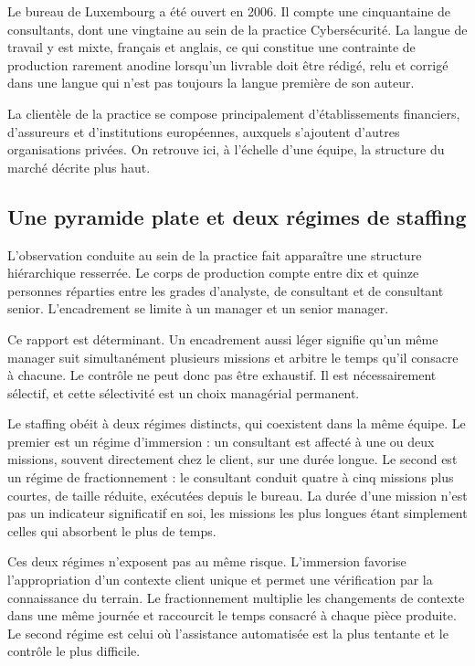 Le bureau de Luxembourg a été ouvert en 2006. Il compte une cinquantaine de consultants,
dont une vingtaine au sein de la practice Cybersécurité. La langue de travail y est mixte,
français et anglais, ce qui constitue une contrainte de production rarement anodine
lorsqu'un livrable doit être rédigé, relu et corrigé dans une langue qui n'est pas toujours
la langue première de son auteur.

La clientèle de la practice se compose principalement d'établissements financiers,
d'assureurs et d'institutions européennes, auxquels s'ajoutent d'autres organisations
privées. On retrouve ici, à l'échelle d'une équipe, la structure du marché décrite plus
haut.

\subsection{Une pyramide plate et deux régimes de staffing}

L'observation conduite au sein de la practice fait apparaître une structure hiérarchique
resserrée. Le corps de production compte entre dix et quinze personnes réparties entre les
grades d'analyste, de consultant et de consultant senior. L'encadrement se limite à un
manager et un senior manager.

Ce rapport est déterminant. Un encadrement aussi léger signifie qu'un même manager suit
simultanément plusieurs missions et arbitre le temps qu'il consacre à chacune. Le contrôle
ne peut donc pas être exhaustif. Il est nécessairement sélectif, et cette sélectivité est
un choix managérial permanent.

Le staffing obéit à deux régimes distincts, qui coexistent dans la même équipe. Le premier
est un régime d'immersion : un consultant est affecté à une ou deux missions, souvent
directement chez le client, sur une durée longue. Le second est un régime de
fractionnement : le consultant conduit quatre à cinq missions plus courtes, de taille
réduite, exécutées depuis le bureau. La durée d'une mission n'est pas un indicateur
significatif en soi, les missions les plus longues étant simplement celles qui absorbent le
plus de temps.

Ces deux régimes n'exposent pas au même risque. L'immersion favorise l'appropriation d'un
contexte client unique et permet une vérification par la connaissance du terrain. Le
fractionnement multiplie les changements de contexte dans une même journée et raccourcit le
temps consacré à chaque pièce produite. Le second régime est celui où
l'assistance automatisée est la plus tentante et le contrôle le plus difficile.

